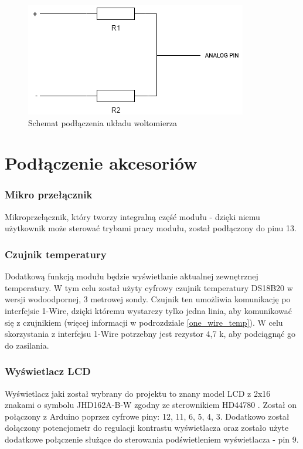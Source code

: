 \begin{figure}[!htb]
\centering
\includegraphics[width=0.7\linewidth]{Rysunki/voltometer_schemat.png}
\caption{Schemat podłączenia układu woltomierza}
\label{fig:voltometer}
\end{figure}


\section{Podłączenie akcesoriów}

\subsubsection{Mikro przełącznik}
Mikroprzełącznik, który tworzy integralną część modułu - dzięki niemu użytkownik może sterować trybami pracy modułu, został podłączony do pinu 13.

\subsubsection{Czujnik temperatury}
Dodatkową funkcją modułu będzie wyświetlanie aktualnej zewnętrznej temperatury. W tym celu został użyty cyfrowy czujnik temperatury DS18B20\cite{DS18B20_datasheet} w wersji wodoodpornej, 3 metrowej sondy. Czujnik ten umożliwia komunikację po interfejsie 1-Wire, dzięki któremu wystarczy tylko jedna linia, aby komunikować się z czujnikiem (więcej informacji w podrozdziale \ref{one_wire_temp}). W celu skorzystania z interfejsu 1-Wire potrzebny jest rezystor 4,7 k\textOmega, aby podciągnąć go do zasilania.

\subsubsection{Wyświetlacz LCD}
Wyświetlacz jaki został wybrany do projektu to znany model LCD z 2x16 znakami o symbolu JHD162A-B-W zgodny ze sterownikiem HD44780 \cite{HD44780_datasheet}. Został on połączony z Arduino poprzez cyfrowe piny: 12, 11, 6, 5, 4, 3. Dodatkowo został dołączony potencjometr do regulacji kontrastu wyświetlacza oraz zostało użyte dodatkowe połączenie służące do sterowania podświetleniem wyświetlacza - pin 9.

